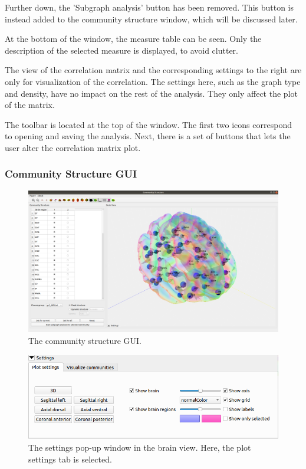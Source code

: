\documentclass{article}
\begin{document}
Further down, the 'Subgraph analysis' button has been removed. This button is instead added to the community structure window, which will be discussed later. 

At the bottom of the window, the measure table can be seen. Only the description of the selected measure is displayed, to avoid clutter.

The view of the correlation matrix and the corresponding settings to the right are only for visualization of the correlation. The settings here, such as the graph type and density, have no impact on the rest of the analysis. They only affect the plot of the matrix.

The toolbar is located at the top of the window. The first two icons correspond to opening and saving the analysis. Next, there is a set of buttons that lets the user alter the correlation matrix plot.

\subsubsection{Community Structure GUI}

\begin{figure}[h]
    \centering
    \includegraphics[width=\linewidth]{community_structure.png}
    \caption{The community structure GUI.}
    \label{fig:community}
\end{figure}

\begin{figure}[h]
    \centering
    \includegraphics[width=\linewidth]{plot_settings.png}
    \caption{The settings pop-up window in the brain view. Here, the plot settings tab is selected.}
    \label{fig:plot_settings}
\end{figure}
\end{document}
